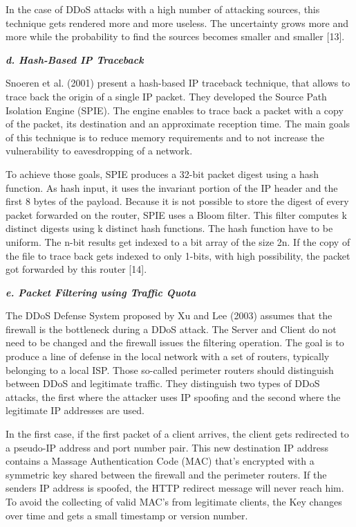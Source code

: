 In the case of DDoS attacks with a high number of attacking sources, this technique gets rendered more and more useless. The uncertainty grows more and more while the probability to find the sources becomes smaller and smaller [13].

\textbf{\textit{d. Hash-Based IP Traceback}}

Snoeren et al. (2001) present a hash-based IP traceback technique, that allows to trace back the origin of a single IP packet. They developed the Source Path Isolation Engine (SPIE). The engine enables to trace back a packet with a copy of the packet, its destination and an approximate reception time. The main goals of this technique is to reduce memory requirements and to not increase the vulnerability to eavesdropping of a network.

To achieve those goals, SPIE produces a 32-bit packet digest using a hash function. As hash input, it uses the invariant portion of the IP header and the first 8 bytes of the payload. Because it is not possible to store the digest of every packet forwarded on the router, SPIE uses a Bloom filter. This filter computes k distinct digests using k distinct hash functions. The hash function have to be uniform. The n-bit results get indexed to a bit array of the size 2n. If the copy of the file to trace back gets indexed to only 1-bits, with high possibility, the packet got forwarded by this router [14].

\textbf{\textit{e. Packet Filtering using Traffic Quota}}

The DDoS Defense System proposed by Xu and Lee (2003) assumes that the firewall is the bottleneck during a DDoS attack. The Server and Client do not need to be changed and the firewall issues the filtering operation. The goal is to produce a line of defense in the local network with a set of routers, typically belonging to a local ISP. Those so-called perimeter routers should distinguish between DDoS and legitimate traffic. They distinguish two types of DDoS attacks, the first where the attacker uses IP spoofing and the second where the legitimate IP addresses are used.

In the first case, if the first packet of a client arrives, the client gets redirected to a pseudo-IP address and port number pair. This new destination IP address contains a Massage Authentication Code (MAC) that's encrypted with a symmetric key shared between the firewall and the perimeter routers. If the senders IP address is spoofed, the HTTP redirect message will never reach him.
To avoid the collecting of valid MAC's from legitimate clients, the Key changes over time and gets a small timestamp or version number.

